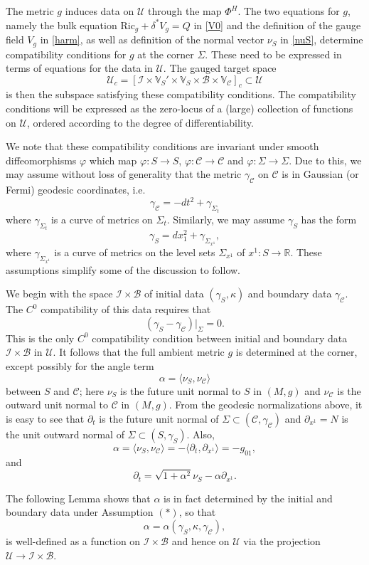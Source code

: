 \documentclass[10pt]{amsart}
\renewcommand{\a}{\alpha}
\newcommand{\g}{\gamma}
\renewcommand{\d}{\delta}
\newcommand{\f}{\varphi}
\newcommand{\Si}{\Sigma}
\renewcommand{\k}{\kappa}
\newcommand{\cC}{{\mathcal C}}
\newcommand{\cB}{{\mathcal B}}
\newcommand{\cU}{{\mathcal U}}
\newcommand{\cI}{\mathcal I}
\newcommand{\bR}{\mathbb R}
\newcommand{\bV}{\mathbb V}
\newcommand{\Ric}{\mathrm{Ric}}
\newcommand{\be}{\begin{equation}}
\newcommand{\ee}{\end{equation}}
\newcommand{\p}{\partial}
\renewcommand{\to}{\rightarrow}
\newcommand{\<}{\langle}
\renewcommand{\>}{\rangle}
\theoremstyle{plain}
\theoremstyle{remark}
\theoremstyle{definition}
\numberwithin{equation}{section}
\begin{document}
  The metric $g$ induces data on $\cU$ through the map $\Phi^H$. The two equations for $g$, namely the bulk equation $\Ric_g + \d^*V_g = Q$ in \eqref{V0}
and the definition of the gauge field $V_g$ in \eqref{harm}, as well as definition of the normal vector $\nu_S$ in \eqref{nuS}, determine compatibility 
conditions for $g$ at the corner $\Si$. These need to be expressed in terms of equations for the data in $\cU$. The gauged target space   
$$\cU_c = [\cI \times \bV_S' \times \bV_S \times \cB \times \bV_{\cC}]_c \subset \cU $$
is then the subspace satisfying these compatibility conditions. The compatibility conditions will be expressed as the zero-locus of a (large) collection of 
functions on $\cU$, ordered according to the degree of differentiability. 

\medskip 

  We note that these compatibility conditions are invariant under smooth diffeomorphisms $\f$ which 
 map $\f: S \to S$, $\f: \cC \to \cC$ and $\f: \Si \to \Si$. Due to this, we may assume without loss of generality that the metric $\g_{\cC}$ on $\cC$ 
 is in Gaussian (or Fermi) geodesic coordinates, i.e.
 $$\g_{\cC} = -dt^2 + \g_{\Si_t}$$
 where $\g_{\Si_t}$ is a curve of metrics on $\Si_t$. Similarly, we may assume $\g_S$ has the form 
 $$\g_S = dx_1^2 + \g_{\Si_{x^1}},$$
 where $\g_{\Si_{x^1}}$ is a curve of metrics on the level sets $\Si_{x^1}$ of $x^1: S \to \bR$. These assumptions simplify some of the discussion to follow. 
 
\medskip  
 
  We begin with the space $\cI \times \cB$ of initial data $(\g_S, \k)$ and boundary data $\g_{\cC}$. The $C^0$ compatibility of this data requires that 
\be \label{Com0}
(\g_{S}  -  \g_{\cC})|_{\Si}  = 0 .
\ee
This is the only $C^0$ compatibility condition between initial and boundary data $\cI \times \cB$ in $\cU$. It follows that the full ambient metric $g$ is determined 
at the corner, except possibly for the angle term 
\be \label{alpha}
\a = \<\nu_S, \nu_{\cC}\>
\ee
between $S$ and $\cC$; here $\nu_S$ is the future unit normal to $S$ in 
$(M, g)$ and $\nu_{\cC}$ is the outward unit normal to $\cC$ in $(M, g)$. From the geodesic normalizations above, it is easy to see 
that $\p_t$ is the future unit normal of $\Si \subset (\cC, \g_{\cC})$ and $\p_{x^1} = N$ is the unit outward normal of $\Si \subset (S, \g_S)$. 
Also, 
$$\a = \<\nu_S, \nu_{\cC}\> = -\<\p_t, \p_{x^1}\> = -g_{01},$$
and 
\be \label{TC}
\p_t = \sqrt{1+\a^2}\nu_S -\a \p_{x^1}.
\ee

  The following Lemma shows that $\a$ is in fact determined by the initial and boundary data under Assumption $(*)$, so that 
$$\a = \a(\g_S, \k, \g_{\cC}),$$
is well-defined as a function on $\cI \times \cB$ and hence on $\cU$ via the projection $\cU \to \cI \times \cB$.  
\end{document}
